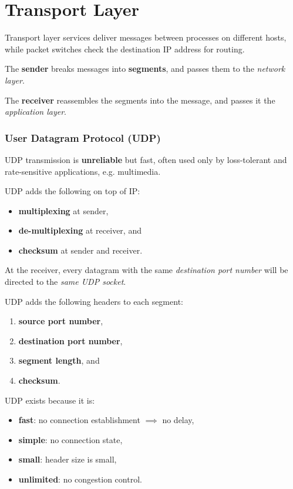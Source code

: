 \part{Transport Layer}

Transport layer services deliver messages between processes on different hosts,
while packet switches check the destination IP address for routing.

The \textbf{sender} breaks messages into \textbf{segments}, and passes them to
the \textit{network layer}.

The \textbf{receiver} reassembles the segments into the message, and passes it
the \textit{application layer}.


\section{User Datagram Protocol (UDP)}
UDP transmission is \textbf{unreliable} but fast, often used only by loss-tolerant and rate-sensitive
applications, e.g. multimedia.

UDP adds the following on top of IP:

\begin{itemize}
    \item \textbf{multiplexing} at sender,
    \item \textbf{de-multiplexing} at receiver, and
    \item \textbf{checksum} at sender and receiver.
\end{itemize}

At the receiver, every datagram with the same \textit{destination port number}
will be directed to the \textit{same UDP socket}.

UDP adds the following headers to each segment:

\begin{enumerate}[leftmargin=*]
    \item \textbf{source port number},
    \item \textbf{destination port number},
    \item \textbf{segment length}, and
    \item \textbf{checksum}.
\end{enumerate}

UDP exists because it is:
\begin{itemize}
    \item \textbf{fast}: no connection establishment $\implies$ no delay,
    \item \textbf{simple}: no connection state,
    \item \textbf{small}: header size is small,
    \item \textbf{unlimited}: no congestion control.
\end{itemize}


